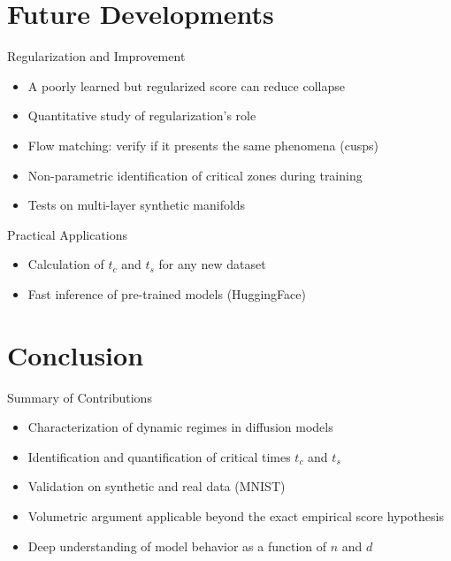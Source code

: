\documentclass[aspectratio=169]{beamer}
\begin{document}
\section{Future Developments}

\begin{frame}{Regularization and Improvement}
    \begin{itemize}
        \item A poorly learned but regularized score can reduce collapse
        \item Quantitative study of regularization's role
        \item Flow matching: verify if it presents the same phenomena (cusps)
        \item Non-parametric identification of critical zones during training
        \item Tests on multi-layer synthetic manifolds
    \end{itemize}
\end{frame}

\begin{frame}{Practical Applications}
    \begin{itemize}
        \item Calculation of $t_c$ and $t_s$ for any new dataset
        \item Fast inference of pre-trained models (HuggingFace)
    \end{itemize}
\end{frame}

\section{Conclusion}

\begin{frame}{Summary of Contributions}
    \begin{itemize}
        \item Characterization of dynamic regimes in diffusion models
        \item Identification and quantification of critical times $t_c$ and $t_s$
        \item Validation on synthetic and real data (MNIST)
        \item Volumetric argument applicable beyond the exact empirical score hypothesis
        \item Deep understanding of model behavior as a function of $n$ and $d$
    \end{itemize}
\end{frame}
\end{document}
